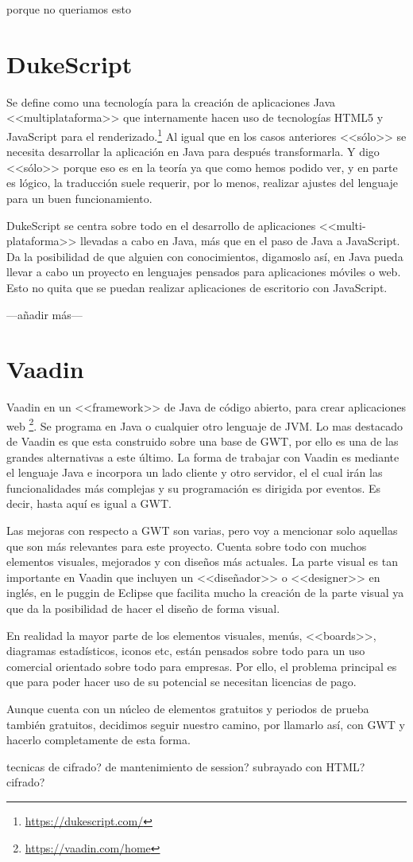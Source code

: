 porque no queriamos esto

\section{DukeScript}

Se define como una tecnología para la creación de aplicaciones Java <<multiplataforma>> que internamente hacen uso de tecnologías HTML5 y JavaScript para el renderizado.\footnote{\url{https://dukescript.com/}}
Al igual que en los casos anteriores <<sólo>> se necesita desarrollar la aplicación en Java para después transformarla. Y digo <<sólo>> porque eso es en la teoría ya que como hemos podido ver, y en parte es lógico, la traducción suele requerir, por lo menos, realizar ajustes del lenguaje para un buen funcionamiento.

DukeScript se centra sobre todo en el desarrollo de aplicaciones <<multi-plataforma>> llevadas a cabo en Java, más que en el paso de Java a JavaScript. Da la posibilidad de que alguien con conocimientos, digamoslo así, en Java pueda llevar a cabo un proyecto en lenguajes pensados para aplicaciones móviles o web. Esto no quita que se puedan realizar aplicaciones de escritorio con JavaScript.

---añadir más---

\section{Vaadin}

Vaadin en un <<framework>> de Java de código abierto, para crear aplicaciones web \footnote{\url{https://vaadin.com/home}}. Se programa en Java o cualquier otro lenguaje de JVM. Lo mas destacado de Vaadin es que esta construido sobre una base de GWT, por ello es una de las grandes alternativas a este último. La forma de trabajar con Vaadin es mediante el lenguaje Java e incorpora un lado cliente y otro servidor, el el cual irán las funcionalidades más complejas y su programación es dirigida por eventos. Es decir, hasta aquí es igual a GWT.

Las mejoras con respecto a GWT son varias, pero voy a mencionar solo aquellas que son más relevantes para este proyecto. Cuenta sobre todo con muchos elementos visuales, mejorados y con diseños más actuales. La parte visual es tan importante en Vaadin que incluyen un <<diseñador>> o <<designer>> en inglés, en le puggin de Eclipse que facilita mucho la creación de la parte visual ya que da la posibilidad de hacer el diseño de forma visual.

En realidad la mayor parte de los elementos visuales, menús, <<boards>>, diagramas estadísticos, iconos etc, están pensados sobre todo para un uso comercial orientado sobre todo para empresas. Por ello, el problema principal es que para poder hacer uso de su potencial se necesitan licencias de pago.

Aunque cuenta con un núcleo de elementos gratuitos y periodos de prueba también gratuitos, decidimos seguir nuestro camino, por llamarlo así, con GWT y hacerlo completamente de esta forma.

tecnicas de cifrado? 
de mantenimiento de session?
subrayado con HTML?
cifrado?